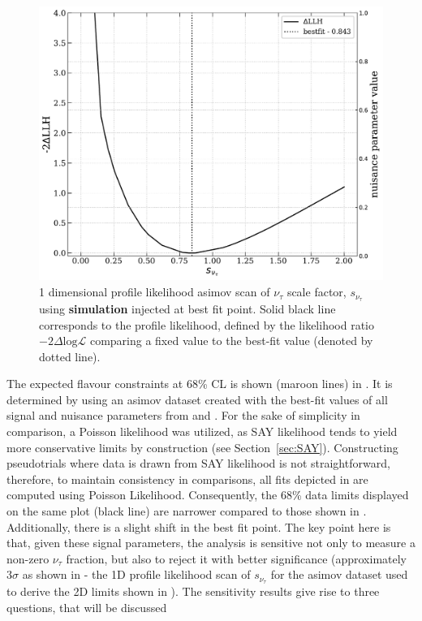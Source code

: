 \begin{figure}
    
    \includegraphics{./figures/results/simulation_profile_scan_astro_nutau_ratio.pdf}
    
    \caption{1 dimensional profile likelihood asimov scan of $\nu_{\tau}$ scale factor, $s_{\nu_{\tau}}$ using \textbf{simulation} injected at best fit point. Solid black line corresponds to the profile likelihood, defined by the likelihood ratio $-2\Delta\mathrm{log}\mathcal{L}$ comparing a fixed value to the best-fit value (denoted by dotted line).}

\end{figure}

The expected flavour constraints at 68\% CL is shown (maroon lines) in . It is determined by using an asimov dataset  created with the best-fit values of all signal and nuisance parameters from  and . For the sake of simplicity in comparison, a Poisson likelihood was utilized, as SAY likelihood tends to yield more conservative limits by construction (see Section~\ref{sec:SAY}). Constructing pseudotrials where data is drawn from SAY likelihood is not straightforward, therefore, to maintain consistency in comparisons, all fits depicted in  are computed using Poisson Likelihood. Consequently, the 68\% data limits displayed on the same plot (black line) are narrower compared to those shown in . Additionally, there is a slight shift in the best fit point. The key point here is that, given these signal parameters, the analysis is sensitive not only to measure a non-zero $\nu_{\tau}$ fraction, but also to reject it with better significance (approximately $3\sigma$ as shown in  - the 1D profile likelihood scan of $s_{\nu_{\tau}}$ for the asimov dataset used to derive the 2D limits shown in ). The sensitivity results give rise to three questions, that will be discussed

